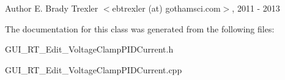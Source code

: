 \begin{DoxyAuthor}{Author}
E. Brady Trexler $<$ebtrexler (at) gothamsci.\+com$>$, 2011 -\/ 2013 
\end{DoxyAuthor}


The documentation for this class was generated from the following files\+:\begin{DoxyCompactItemize}
\item 
G\+U\+I\+\_\+\+R\+T\+\_\+\+Edit\+\_\+\+Voltage\+Clamp\+P\+I\+D\+Current.\+h\item 
G\+U\+I\+\_\+\+R\+T\+\_\+\+Edit\+\_\+\+Voltage\+Clamp\+P\+I\+D\+Current.\+cpp\end{DoxyCompactItemize}
